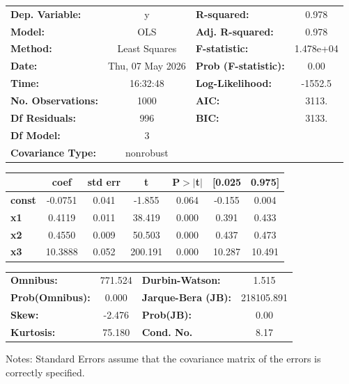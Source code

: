 \begin{center}
\begin{tabular}{lclc}
\toprule
\textbf{Dep. Variable:}    &        y         & \textbf{  R-squared:         } &     0.978   \\
\textbf{Model:}            &       OLS        & \textbf{  Adj. R-squared:    } &     0.978   \\
\textbf{Method:}           &  Least Squares   & \textbf{  F-statistic:       } & 1.478e+04   \\
\textbf{Date:}             & Thu, 07 May 2026 & \textbf{  Prob (F-statistic):} &     0.00    \\
\textbf{Time:}             &     16:32:48     & \textbf{  Log-Likelihood:    } &   -1552.5   \\
\textbf{No. Observations:} &        1000      & \textbf{  AIC:               } &     3113.   \\
\textbf{Df Residuals:}     &         996      & \textbf{  BIC:               } &     3133.   \\
\textbf{Df Model:}         &           3      & \textbf{                     } &             \\
\textbf{Covariance Type:}  &    nonrobust     & \textbf{                     } &             \\
\bottomrule
\end{tabular}
\begin{tabular}{lcccccc}
               & \textbf{coef} & \textbf{std err} & \textbf{t} & \textbf{P$> |$t$|$} & \textbf{[0.025} & \textbf{0.975]}  \\
\midrule
\textbf{const} &      -0.0751  &        0.041     &    -1.855  &         0.064        &       -0.155    &        0.004     \\
\textbf{x1}    &       0.4119  &        0.011     &    38.419  &         0.000        &        0.391    &        0.433     \\
\textbf{x2}    &       0.4550  &        0.009     &    50.503  &         0.000        &        0.437    &        0.473     \\
\textbf{x3}    &      10.3888  &        0.052     &   200.191  &         0.000        &       10.287    &       10.491     \\
\bottomrule
\end{tabular}
\begin{tabular}{lclc}
\textbf{Omnibus:}       & 771.524 & \textbf{  Durbin-Watson:     } &     1.515   \\
\textbf{Prob(Omnibus):} &   0.000 & \textbf{  Jarque-Bera (JB):  } & 218105.891  \\
\textbf{Skew:}          &  -2.476 & \textbf{  Prob(JB):          } &      0.00   \\
\textbf{Kurtosis:}      &  75.180 & \textbf{  Cond. No.          } &      8.17   \\
\bottomrule
\end{tabular}
\end{center}

Notes: \newline
 [1] Standard Errors assume that the covariance matrix of the errors is correctly specified.